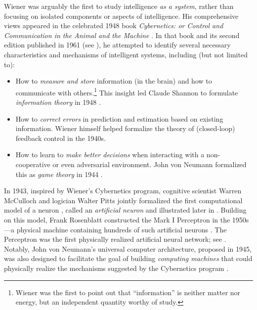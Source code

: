 \documentclass[../../book-main.tex]{subfiles}
\begin{document}
Wiener was arguably the first to study intelligence \textit{as a
system}, rather than focusing on isolated components or aspects of
intelligence. His comprehensive views appeared in the celebrated 1948
book \textit{Cybernetics: or Control and Communication in the Animal
and the Machine} \cite{Wiener-Cybernetics-1948}. In that book and its
second edition published in 1961 \cite{Wiener-Cybernetics-1961} (see
), he attempted to identify several necessary
characteristics and mechanisms of intelligent systems, including (but
not limited to):
\begin{itemize}
    \item How to \textit{measure and store} information (in the
        brain) and how to communicate with others.\footnote{Wiener
            was the first to point out that ``information'' is neither
            matter nor energy, but an independent quantity worthy of
        study.} This insight led Claude Shannon to formulate
        \textit{information theory} in 1948 \cite{Shannon-1948}.
    \item How to \textit{correct errors} in prediction and estimation
        based on existing information. Wiener himself helped
        formalize the theory of (closed-loop) feedback control in the 1940s.
    \item How to learn to \textit{make better decisions} when
        interacting with a non-cooperative or even adversarial
        environment. John von Neumann formalized this as \textit{game
        theory} in 1944 \cite{von-Neumann-1944}.
\end{itemize}
In 1943, inspired by Wiener's Cybernetics program, cognitive
scientist Warren McCulloch and logician Walter Pitts jointly
formalized the first computational model of a neuron
\cite{McCulloch-Pitts}, called an \textit{artificial neuron} and
illustrated later in . Building on this model, Frank
Rosenblatt constructed the Mark I Perceptron in the 1950s---a
physical machine containing hundreds of such artificial neurons
\cite{Rosenblatt:1957}. The Perceptron was the first physically
realized artificial neural network; see .
Notably, John von Neumann's universal computer architecture, proposed
in 1945, was also designed to facilitate the goal of building
\textit{computing machines} that could physically realize the
mechanisms suggested by the Cybernetics program \cite{von-Neumann-1958}.
\end{document}
